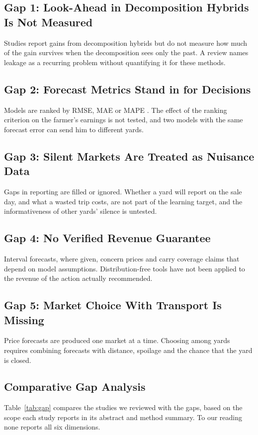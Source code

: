 \documentclass{ieeeaccess}
\begin{document}
\subsection{Gap 1: Look-Ahead in Decomposition Hybrids Is Not Measured}
Studies report gains from decomposition hybrids \cite{sathe2025,celik2025} but do not measure how much of the gain survives when the decomposition sees only the past. A review names leakage as a recurring problem \cite{wu2026} without quantifying it for these methods.

\subsection{Gap 2: Forecast Metrics Stand in for Decisions}
Models are ranked by RMSE, MAE or MAPE \cite{ray2023,meena2024,bundak2025}. The effect of the ranking criterion on the farmer's earnings is not tested, and two models with the same forecast error can send him to different yards.

\subsection{Gap 3: Silent Markets Are Treated as Nuisance Data}
Gaps in reporting are filled or ignored. Whether a yard will report on the sale day, and what a wasted trip costs, are not part of the learning target, and the informativeness of other yards' silence is untested.

\subsection{Gap 4: No Verified Revenue Guarantee}
Interval forecasts, where given, concern prices \cite{ray2023,sathe2025} and carry coverage claims that depend on model assumptions. Distribution-free tools \cite{romano2019,gibbs2021} have not been applied to the revenue of the action actually recommended.

\subsection{Gap 5: Market Choice With Transport Is Missing}
Price forecasts are produced one market at a time. Choosing among yards requires combining forecasts with distance, spoilage and the chance that the yard is closed.

\subsection{Comparative Gap Analysis}
Table~\ref{tab:gap} compares the studies we reviewed with the gaps, based on the scope each study reports in its abstract and method summary. To our reading none reports all six dimensions.
\end{document}
